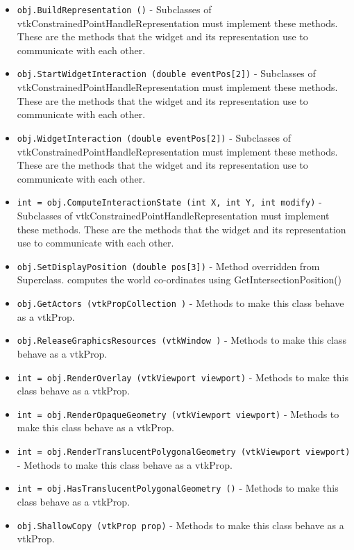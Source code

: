 \begin{itemize}
\item  \verb|obj.BuildRepresentation ()| -  Subclasses of vtkConstrainedPointHandleRepresentation must implement these methods. These
 are the methods that the widget and its representation use to
 communicate with each other.

\item  \verb|obj.StartWidgetInteraction (double eventPos[2])| -  Subclasses of vtkConstrainedPointHandleRepresentation must implement these methods. These
 are the methods that the widget and its representation use to
 communicate with each other.

\item  \verb|obj.WidgetInteraction (double eventPos[2])| -  Subclasses of vtkConstrainedPointHandleRepresentation must implement these methods. These
 are the methods that the widget and its representation use to
 communicate with each other.

\item  \verb|int = obj.ComputeInteractionState (int X, int Y, int modify)| -  Subclasses of vtkConstrainedPointHandleRepresentation must implement these methods. These
 are the methods that the widget and its representation use to
 communicate with each other.

\item  \verb|obj.SetDisplayPosition (double pos[3])| -  Method overridden from Superclass. computes the world
 co-ordinates using GetIntersectionPosition()

\item  \verb|obj.GetActors (vtkPropCollection )| -  Methods to make this class behave as a vtkProp.

\item  \verb|obj.ReleaseGraphicsResources (vtkWindow )| -  Methods to make this class behave as a vtkProp.

\item  \verb|int = obj.RenderOverlay (vtkViewport viewport)| -  Methods to make this class behave as a vtkProp.

\item  \verb|int = obj.RenderOpaqueGeometry (vtkViewport viewport)| -  Methods to make this class behave as a vtkProp.

\item  \verb|int = obj.RenderTranslucentPolygonalGeometry (vtkViewport viewport)| -  Methods to make this class behave as a vtkProp.

\item  \verb|int = obj.HasTranslucentPolygonalGeometry ()| -  Methods to make this class behave as a vtkProp.

\item  \verb|obj.ShallowCopy (vtkProp prop)| -  Methods to make this class behave as a vtkProp.

\end{itemize}
